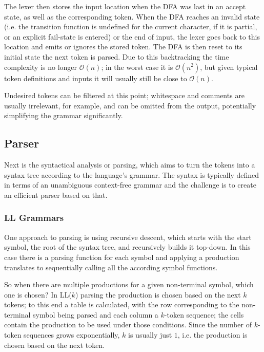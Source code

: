 			The lexer then stores the input location when the DFA was last in an accept state, as well as the corresponding token. When the DFA reaches an invalid state (i.e. the transition function is undefined for the current character, if it is partial, or an explicit fail-state is entered) or the end of input, the lexer goes back to this location and emits or ignores the stored token. The DFA is then reset to its initial state the next token is parsed. Due to this backtracking the time complexity is no longer $\mathcal{O}(n)$; in the worst case it is $\mathcal{O}(n^2)$, but given typical token definitions and inputs it will usually still be close to $\mathcal{O}(n)$.
			
			Undesired tokens can be filtered at this point; whitespace and comments are usually irrelevant, for example, and can be omitted from the output, potentially simplifying the grammar significantly.
		
		\subsection{Parser}
			
			Next is the syntactical analysis or parsing, which aims to turn the tokens into a syntax tree according to the language's grammar. The syntax is typically defined in terms of an unambiguous context-free grammar and the challenge is to create an efficient parser based on that.
			
			\subsubsection{LL Grammars}
			
			One approach to parsing is using recursive descent, which starts with the start symbol, the root of the syntax tree, and recursively builds it top-down. In this case there is a parsing function for each symbol and applying a production translates to sequentially calling all the according symbol functions.
			
			So when there are multiple productions for a given non-terminal symbol, which one is chosen? In LL($k$) parsing the production is chosen based on the next $k$ tokens; to this end a table is calculated, with the row corresponding to the non-terminal symbol being parsed and each column a $k$-token sequence; the cells contain the production to be used under those conditions. Since the number of $k$-token sequences grows exponentially, $k$ is usually just $1$, i.e. the production is chosen based on the next token.
			
